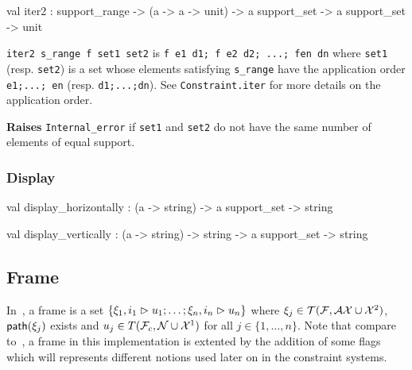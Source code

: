 \label{val:Constraint.iter2}\begin{ocamldoccode}
val iter2 :
  support_range ->
  ({\textquotesingle}a -> {\textquotesingle}a -> unit) ->
  {\textquotesingle}a support_set -> {\textquotesingle}a support_set -> unit
\end{ocamldoccode}
\begin{ocamldocdescription}
{\tt{iter2 s\_range f set1 set2}} is {\tt{f e1 d1; f e2 d2; ...; fen dn}} where {\tt{set1}} (resp. {\tt{set2}})
    is a set whose elements satisfying {\tt{s\_range}} have the application order {\tt{e1;...; en}} 
    (resp. {\tt{d1;...;dn}}). See {\tt{Constraint.iter}} for more details on the application order.

{\bf Raises} {\tt{Internal\_error}} if {\tt{set1}} and {\tt{set2}} do not have the same number of elements  of equal support.


\end{ocamldocdescription}




\subsubsection{Display}




\label{val:Constraint.display-underscorehorizontally}\begin{ocamldoccode}
val display_horizontally : ({\textquotesingle}a -> string) -> {\textquotesingle}a support_set -> string
\end{ocamldoccode}




\label{val:Constraint.display-underscorevertically}\begin{ocamldoccode}
val display_vertically : ({\textquotesingle}a -> string) -> string -> {\textquotesingle}a support_set -> string
\end{ocamldoccode}




\subsection{Frame}




In~\thesis, a frame is a set $\{ \xi_1, i_1 \vartriangleright u_1; \ldots; \xi_n, i_n \vartriangleright u_n\}$ where 
    $\xi_j \in \mathcal{T}(\mathcal{F}, \mathcal{AX} \cup \mathcal{X}^2)$, $\mathsf{path}(\xi_j)$ exists and $u_j \in T(\mathcal{F}_c, \mathcal{N} \cup \mathcal{X}^1)$
    for all $j \in \{1, \ldots, n\}$. Note that compare to~\thesis, a frame in this implementation is
    extented by the addition of some flags which will represents different notions used 
    later on in the constraint systems. 



